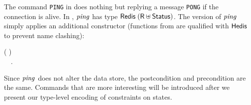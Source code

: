 The command \texttt{PING} in \Redis{} does nothing but replying a message
\texttt{PONG} if the connection is alive. In \Hedis{}, \ensuremath{\Varid{ping}} has type
\ensuremath{\Conid{Redis}\;(\Conid{R} \uplus \Conid{Status})}. The \Edis{} version of \ensuremath{\Varid{ping}} simply applies an additional constructor (functions from \Hedis{} are qualified with \ensuremath{\Conid{Hedis}} to
prevent name clashing):
\begin{hscode}\SaveRestoreHook
{}%
%
\>[B]{}\mathbin{::}\;\;\;( \uplus {}){}\<[E]%
\\
\>[B]{}\mathrel{=}\;~~.{}\<[E]%
\ColumnHook
\end{hscode}\resethooks
Since \ensuremath{\Varid{ping}} does not alter the data store, the postcondition and precondition
are the same. Commands that are more interesting will be introduced after
we present our type-level encoding of constraints on states.
